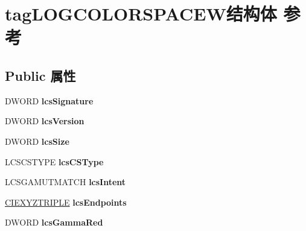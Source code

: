 \hypertarget{structtag_l_o_g_c_o_l_o_r_s_p_a_c_e_w}{}\section{tag\+L\+O\+G\+C\+O\+L\+O\+R\+S\+P\+A\+C\+E\+W结构体 参考}
\label{structtag_l_o_g_c_o_l_o_r_s_p_a_c_e_w}
\subsection*{Public 属性}
\begin{DoxyCompactItemize}
\item 
\mbox{\label{structtag_l_o_g_c_o_l_o_r_s_p_a_c_e_w_a693111dcc58b2255bbf59a68c6b8d1a0}} 
D\+W\+O\+RD {\bfseries lcs\+Signature}
\item 
\mbox{\label{structtag_l_o_g_c_o_l_o_r_s_p_a_c_e_w_ad3bd67f4bae23af47a7b0b7a8c091c29}} 
D\+W\+O\+RD {\bfseries lcs\+Version}
\item 
\mbox{\label{structtag_l_o_g_c_o_l_o_r_s_p_a_c_e_w_ab40e65ae520fe5773a008d41cedc8887}} 
D\+W\+O\+RD {\bfseries lcs\+Size}
\item 
\mbox{\label{structtag_l_o_g_c_o_l_o_r_s_p_a_c_e_w_a618ed79dc2ead1bace220bafbba6a7b7}} 
L\+C\+S\+C\+S\+T\+Y\+PE {\bfseries lcs\+C\+S\+Type}
\item 
\mbox{\label{structtag_l_o_g_c_o_l_o_r_s_p_a_c_e_w_a00b5ade81c1bf58d0bec6d5cb55ba195}} 
L\+C\+S\+G\+A\+M\+U\+T\+M\+A\+T\+CH {\bfseries lcs\+Intent}
\item 
\mbox{\label{structtag_l_o_g_c_o_l_o_r_s_p_a_c_e_w_ac263735c0cc2156e5884a510a275c192}} 
\hyperlink{structtag_c_i_e_x_y_z_t_r_i_p_l_e}{C\+I\+E\+X\+Y\+Z\+T\+R\+I\+P\+LE} {\bfseries lcs\+Endpoints}
\item 
\mbox{\label{structtag_l_o_g_c_o_l_o_r_s_p_a_c_e_w_aa62d15b4a5615a23ab937beb9fb1828a}} 
D\+W\+O\+RD {\bfseries lcs\+Gamma\+Red}
\item 

\end{DoxyCompactItemize}
